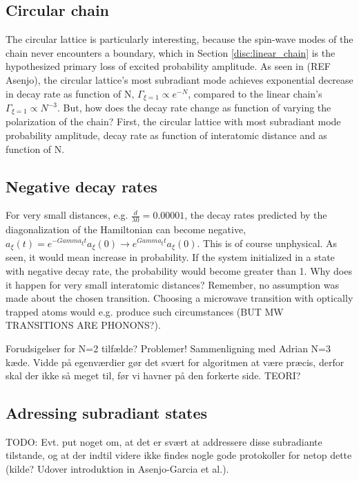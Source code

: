 \documentclass{article}
\begin{document}
\subsection{Circular chain}\label{disc:circular}

The circular lattice is particularly interesting, because the spin-wave modes of the chain never encounters a boundary, which in Section \ref{disc:linear_chain} is the hypothesized primary loss of excited probability amplitude. As seen in (REF Asenjo), the circular lattice's most subradiant mode achieves exponential decrease in decay rate as function of N, $\Gamma_{\xi = 1} \propto e^{-N}$, compared to the linear chain's $\Gamma_{\xi=1} \propto N^{-3}$. But, how does the decay rate change as function of varying the polarization of the chain? First, the circular lattice with most subradiant mode probability amplitude, decay rate as function of interatomic distance and as function of N. 

\subsection{Negative decay rates}

For very small distances, e.g. $\frac{d}{\lambda0} = 0.00001$, the decay rates predicted by the diagonalization of the Hamiltonian can become negative, $a_\xi(t)=e^{-Gamma_\xi t} a_\xi (0) \rightarrow e^{Gamma_\xi t} a_\xi (0)$. This is of course unphysical. As seen, it would mean increase in probability. If the system initialized in a state with negative decay rate, the probability would become greater than 1. Why does it happen for very small interatomic distances? Remember, no assumption was made about the chosen transition. Choosing a microwave transition with optically trapped atoms would e.g. produce such circumstances (BUT MW TRANSITIONS ARE PHONONS?). 

Forudsigelser for N=2 tilfælde? Problemer! Sammenligning med Adrian N=3 kæde. Vidde på egenværdier gør det svært for algoritmen at være præcis, derfor skal der ikke så meget til, før vi havner på den forkerte side. TEORI?

\subsection{Adressing subradiant states}

TODO: Evt. put noget om, at det er svært at addressere disse subradiante tilstande, og at der indtil videre ikke findes nogle gode protokoller for netop dette (kilde? Udover introduktion in Asenjo-Garcia et al.). 
\end{document}
